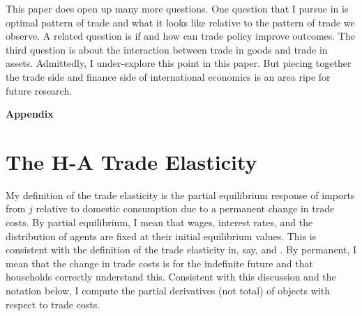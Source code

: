 \documentclass[12pt,pdftex]{article}
\begin{document}
\begin{onehalfspacing}
This paper does open up many more questions. One question that I pursue in \citet{waughoptimal} is optimal pattern of trade and what it looks like relative to the pattern of trade we observe. A related question is if and how can trade policy improve outcomes. The third question is about the interaction between trade in goods and trade in assets.  Admittedly, I under-explore this point in this paper. But piecing together the trade side and finance side of international economics is an area ripe for future research.


\appendix

\clearpage
\newpage

\begin{center}
\textbf{\Large Appendix}
\end{center}


\section{The H-A Trade Elasticity}

My definition of the trade elasticity is the partial equilibrium response of imports from $j$ relative to domestic consumption due to a permanent change in trade costs. By partial equilibrium, I mean that wages, interest rates, and the distribution of agents are fixed at their initial equilibrium values. This is consistent with the definition of the trade elasticity in, say, \citet{arkolakis2012new} and \citet{simonovska2014elasticity}. By permanent, I mean that the change in trade costs is for the indefinite future and that households correctly understand this. Consistent with this discussion and the notation below, I compute the partial derivatives (not total) of objects with respect to trade costs.


\end{onehalfspacing}
\end{document}
